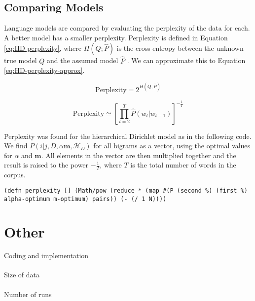 \subsection{Comparing Models}

Language models are compared by evaluating the perplexity of the data for each. A better model has a smaller perplexity. Perplexity is defined in Equation \ref{eq:HD-perplexity}, where $H(Q;\hat{P})$ is the cross-entropy between the unknown true model $Q$ and the assumed model $\hat{P}$ \cite{mackay1995hierarchical}. We can approximate this to Equation \ref{eq:HD-perplexity-approx}.

\begin{equation}
\text{Perplexity}=2^{H(Q;\hat{P})}
\label{eq:HD-perplexity}
\end{equation}

\begin{equation}
\text{Perplexity}\simeq\left[\prod_{t=2}^{T}\hat{P}(w_{t}|w_{t-1})\right]^{-\frac{1}{T}}
\label{eq:HD-perplexity-approx}
\end{equation}

Perplexity was found for the hierarchical Dirichlet model as in the following code. We find $P(i|j,D,\alpha\boldsymbol{m},\mathscr{H}_{D})$ for all bigrams as a vector, using the optimal values for $\alpha$ and $\boldsymbol{m}$. All elements in the vector are then multiplied together and the result is raised to the power $-\frac{1}{T}$, where $T$ is the total number of words in the corpus.

\begin{lstlisting}
(defn perplexity [] (Math/pow (reduce * (map #(P (second %) (first %) alpha-optimum m-optimum) pairs)) (- (/ 1 N))))
\end{lstlisting}


\section{Other}
Coding and implementation
\\ \\
Size of data
\\ \\
Number of runs